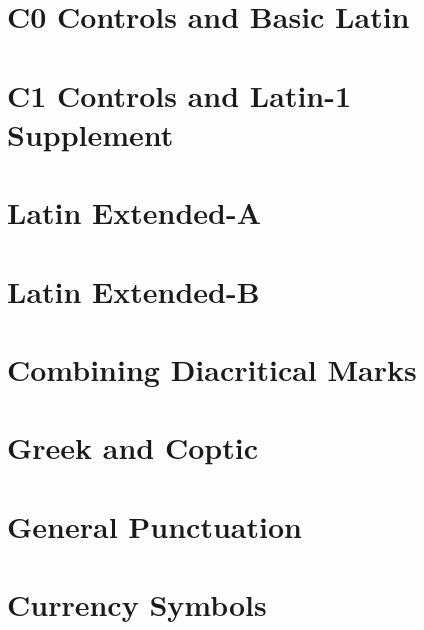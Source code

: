 \documentclass{article}
\begin{document}
\raggedbottom

\section{C0 Controls and Basic Latin}

\section{C1 Controls and Latin-1 Supplement}

\section{Latin Extended-A}

\section{Latin Extended-B}

%
%
\section{Combining Diacritical Marks}

\section{Greek and Coptic}

\section{General Punctuation}

%
\section{Currency Symbols}
\end{document}

